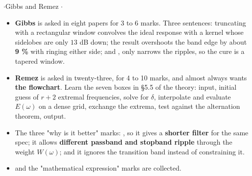 \hr

{\color{sub}\footnotesize {} \gap$\cdot$\gap Gibbs  and Remez 
\gap$\cdot$\gap {}}

\begin{itemize}
  \item \textbf{Gibbs} is asked in eight papers for 3 to 6 marks. Three sentences:
        truncating with a rectangular window convolves the ideal response with a
        kernel whose sidelobes are only $13$ dB down; the result overshoots the band
        edge by about \textbf{9 \%} with ringing either side; and , only narrows the ripples, so the cure is
        a tapered window.
  \item \textbf{Remez} is asked in twenty-three, for 4 to 10 marks, and almost always
        wants \textbf{the flowchart}. Learn the seven boxes in \S5.5 of the theory:
        input, initial guess of $r+2$ extremal frequencies, solve for $\delta$,
        interpolate and evaluate $E(\omega)$ on a dense grid, exchange the extrema,
        test against the alternation theorem, output.
  \item The three "why is it better" marks: , so it gives a
        \textbf{shorter filter} for the same spec; it allows \textbf{different passband
        and stopband ripple} through the weight $W(\omega)$; and it ignores the
        transition band instead of constraining it.
  \item {} and the
        "mathematical expression" marks are collected.
\end{itemize}
